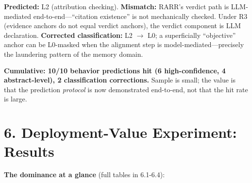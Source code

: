 \documentclass[11pt]{article}
\begin{document}
\textbf{Predicted:} L2 (attribution checking). \textbf{Mismatch:} RARR's verdict path is LLM-mediated end-to-end---``citation existence'' is not mechanically checked. Under R3 (evidence anchors do not equal verdict anchors), the verdict component is LLM declaration. \textbf{Corrected classification:} L2 $\rightarrow$ L0; a superficially ``objective'' anchor can be L0-masked when the alignment step is model-mediated---precisely the laundering pattern of the memory domain.

\textbf{Cumulative: 10/10 behavior predictions hit (6 high-confidence, 4 abstract-level), 2 classification corrections.} Sample is small; the value is that the prediction \emph{protocol} is now demonstrated end-to-end, not that the hit rate is large.

\section{6. Deployment-Value Experiment: Results}\label{deployment-value-experiment-results}

\textbf{The dominance at a glance} (full tables in 6.1-6.4):
\end{document}
